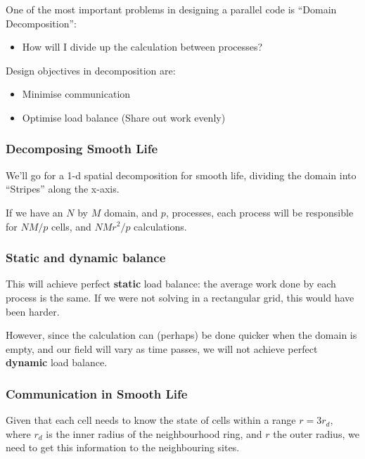 One of the most important problems in designing a parallel code is
``Domain Decomposition'':

\begin{itemize}
\itemsep1pt\parskip0pt
\item
  How will I divide up the calculation between processes?
\end{itemize}

Design objectives in decomposition are:

\begin{itemize}
\itemsep1pt\parskip0pt
\item
  Minimise communication
\item
  Optimise load balance (Share out work evenly)
\end{itemize}

\subsubsection{Decomposing Smooth Life}\label{decomposing-smooth-life}

We'll go for a 1-d spatial decomposition for smooth life, dividing the
domain into ``Stripes'' along the x-axis.

If we have an $N$ by $M$ domain, and $p$, processes, each process will
be responsible for $NM/p$ cells, and $NMr^2/p$ calculations.

\subsubsection{Static and dynamic
balance}\label{static-and-dynamic-balance}

This will achieve perfect \textbf{static} load balance: the average work
done by each process is the same. If we were not solving in a
rectangular grid, this would have been harder.

However, since the calculation can (perhaps) be done quicker when the
domain is empty, and our field will vary as time passes, we will not
achieve perfect \textbf{dynamic} load balance.

\subsubsection{Communication in Smooth
Life}\label{communication-in-smooth-life}

Given that each cell needs to know the state of cells within a range
$r=3r_d$, where $r_d$ is the inner radius of the neighbourhood ring, and
$r$ the outer radius, we need to get this information to the
neighbouring sites.

